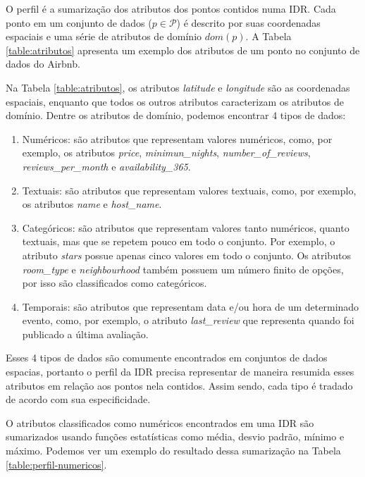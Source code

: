 O perfil é a sumarização dos atributos dos pontos contidos numa IDR. Cada ponto em um conjunto de dados ($p \in \mathcal{P}$) é descrito por suas coordenadas espaciais e uma série de atributos de domínio $dom(p)$. A Tabela \ref{table:atributos} apresenta um exemplo dos atributos de um ponto no conjunto de dados do Airbnb.

Na Tabela \ref{table:atributos}, os atributos {\em latitude} e {\em longitude} são as coordenadas espaciais, enquanto que todos os outros atributos caracterizam os atributos de domínio. Dentre os atributos de domínio, podemos encontrar 4 tipos de dados:

\begin{enumerate}
	\item Numéricos: são atributos que representam valores numéricos, como, por exemplo, os atributos {\em price}, {\em minimun\_nights}, {\em number\_of\_reviews}, {\em reviews\_per\_month} e {\em availability\_365}.
	\item Textuais: são atributos que representam valores textuais, como, por exemplo, os atributos {\em name} e {\em host\_name}.
	\item Categóricos: são atributos que representam valores tanto numéricos, quanto textuais, mas que se repetem pouco em todo o conjunto. Por exemplo, o atributo {\em stars} possue apenas cinco valores em todo o conjunto. Os atributos {\em room\_type} e {\em neighbourhood} também possuem um número finito de opções, por isso são classificados como categóricos.
	\item Temporais: são atributos que representam data e/ou hora de um determinado evento, como, por exemplo, o atributo {\em last\_review} que representa quando foi publicado a última avaliação.
\end{enumerate}

Esses 4 tipos de dados são comumente encontrados em conjuntos de dados espacias, portanto o perfil da IDR precisa representar de maneira resumida esses atributos em relação aos pontos nela contidos. Assim sendo, cada tipo é tradado de acordo com sua especificidade.

O atributos classificados como numéricos encontrados em uma IDR são sumarizados usando funções estatísticas como média, desvio padrão, mínimo e máximo. Podemos ver um exemplo do resultado dessa sumarização na Tabela \ref{table:perfil-numericos}.

